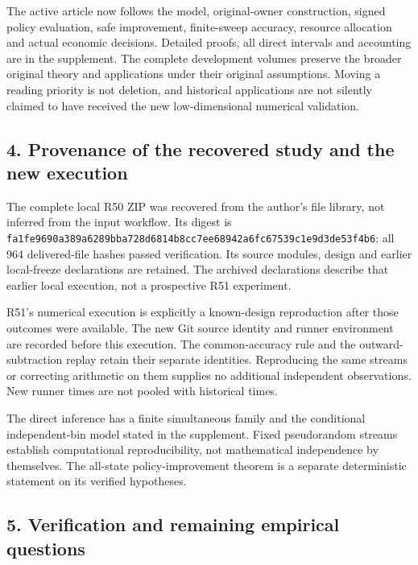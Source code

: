 \documentclass[ecta,nameyear,draft]{econsocart}
\begin{document}
The active article now follows the model, original-owner construction,
signed policy evaluation, safe improvement, finite-sweep accuracy,
resource allocation and actual economic decisions. Detailed proofs, all
direct intervals and accounting are in the supplement. The complete
development volumes preserve the broader original theory and
applications under their original assumptions. Moving a reading priority
is not deletion, and historical applications are not silently claimed to
have received the new low-dimensional numerical validation.

\hypertarget{provenance-of-the-recovered-study-and-the-new-execution}{%
\subsection{4. Provenance of the recovered study and the new
execution}\label{provenance-of-the-recovered-study-and-the-new-execution}}

The complete local R50 ZIP was recovered from the author's file library,
not inferred from the input workflow. Its digest is
\nolinkurl{fa1fe9690a389a6289bba728d6814b8cc7ee68942a6fc67539c1e9d3de53f4b6};
all 964 delivered-file hashes passed verification. Its source modules,
design and earlier local-freeze declarations are retained. The archived
declarations describe that earlier local execution, not a prospective
R51 experiment.

R51's numerical execution is explicitly a known-design reproduction
after those outcomes were available. The new Git source identity and
runner environment are recorded before this execution. The
common-accuracy rule and the outward-subtraction replay retain their
separate identities. Reproducing the same streams or correcting
arithmetic on them supplies no additional independent observations. New
runner times are not pooled with historical times.

The direct inference has a finite simultaneous family and the
conditional independent-bin model stated in the supplement. Fixed
pseudorandom streams establish computational reproducibility, not
mathematical independence by themselves. The all-state
policy-improvement theorem is a separate deterministic statement on its
verified hypotheses.

\hypertarget{verification-and-remaining-empirical-questions}{%
\subsection{5. Verification and remaining empirical
questions}\label{verification-and-remaining-empirical-questions}}
\end{document}
